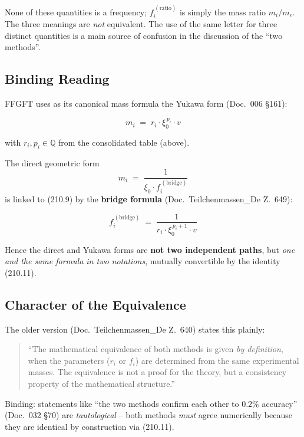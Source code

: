 None of these quantities is a frequency; $f_i^{\,(\text{ratio})}$
is simply the mass ratio $m_i/m_e$.
The three meanings are \emph{not} equivalent. The use of the same
letter for three distinct quantities is a main source of confusion
in the discussion of the \enquote{two methods}.

\subsection*{Binding Reading}

FFGFT uses as its canonical mass formula the Yukawa form
(Doc.~006 §161):

\begin{equation}
  \boxed{\;m_i \;=\; r_i \cdot \xi_0^{\,p_i} \cdot v\;}
  \tag{210.9}
\end{equation}

with $r_i, p_i \in \mathbb{Q}$ from the consolidated table (above).

The direct geometric form
\begin{equation}
  m_i \;=\; \frac{1}{\xi_0 \cdot f_i^{\,(\text{bridge})}}
  \tag{210.10}
\end{equation}
is linked to (210.9) by the \textbf{bridge formula}
(Doc.~Teilchenmassen\_De Z.~649):

\begin{equation}
  \boxed{\;f_i^{\,(\text{bridge})}
  \;=\; \frac{1}{r_i \cdot \xi_0^{\,p_i+1} \cdot v}\;}
  \tag{210.11}
\end{equation}

Hence the direct and Yukawa forms are \textbf{not two independent
paths}, but \emph{one and the same formula in two notations},
mutually convertible by the identity (210.11).

\subsection*{Character of the Equivalence}

The older version (Doc.~Teilchenmassen\_De Z.~640) states this
plainly:

\begin{quote}
\enquote{The mathematical equivalence of both methods is given
\emph{by definition}, when the parameters ($r_i$ or $f_i$) are
determined from the same experimental masses. The equivalence is
not a proof for the theory, but a consistency property of the
mathematical structure.}
\end{quote}

Binding: statements like \enquote{the two methods confirm each other
to $0.2\%$ accuracy} (Doc.~032 §70) are \emph{tautological} -- both
methods \emph{must} agree numerically because they are identical by
construction via (210.11).

